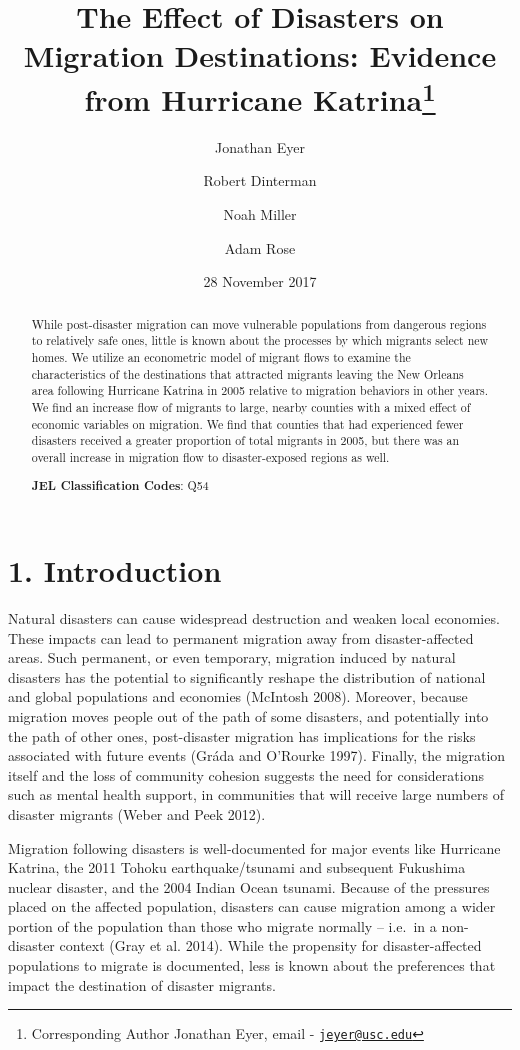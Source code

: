 \documentclass[]{article}
\title{The Effect of Disasters on Migration Destinations: Evidence from
Hurricane Katrina\thanks{Corresponding Author Jonathan Eyer, email -
\href{mailto:jeyer@usc.edu}{\nolinkurl{jeyer@usc.edu}}}}
\author[1]{Jonathan Eyer}
\author[2]{Robert Dinterman}
\author[1]{Noah Miller}
\author[1]{Adam Rose}
\affil[1]{University of Southern California}
\affil[2]{The Ohio State University}
\date{28 November 2017}
\begin{document}
\maketitle

\begin{abstract}
\noindent While post-disaster migration can move vulnerable populations from
dangerous regions to relatively safe ones, little is known about the
processes by which migrants select new homes. We utilize an econometric
model of migrant flows to examine the characteristics of the
destinations that attracted migrants leaving the New Orleans area
following Hurricane Katrina in 2005 relative to migration behaviors in
other years. We find an increase flow of migrants to large, nearby
counties with a mixed effect of economic variables on migration. We find
that counties that had experienced fewer disasters received a greater
proportion of total migrants in 2005, but there was an overall increase
in migration flow to disaster-exposed regions as well.
\vspace{.5cm}

\noindent \textbf{JEL Classification Codes}: Q54
\end{abstract}
\newpage


\newpage

\section{1. Introduction}\label{introduction}


Natural disasters can cause widespread destruction and weaken local
economies. These impacts can lead to permanent migration away from
disaster-affected areas. Such permanent, or even temporary, migration
induced by natural disasters has the potential to significantly reshape
the distribution of national and global populations and economies
(McIntosh 2008). Moreover, because migration moves people out of the
path of some disasters, and potentially into the path of other ones,
post-disaster migration has implications for the risks associated with
future events (Gráda and O'Rourke 1997). Finally, the migration itself
and the loss of community cohesion suggests the need for considerations
such as mental health support, in communities that will receive large
numbers of disaster migrants (Weber and Peek 2012).

Migration following disasters is well-documented for major events like
Hurricane Katrina, the 2011 Tohoku earthquake/tsunami and subsequent
Fukushima nuclear disaster, and the 2004 Indian Ocean tsunami. Because
of the pressures placed on the affected population, disasters can cause
migration among a wider portion of the population than those who migrate
normally -- i.e.~in a non-disaster context (Gray et al. 2014). While the
propensity for disaster-affected populations to migrate is documented,
less is known about the preferences that impact the destination of
disaster migrants.
\end{document}
